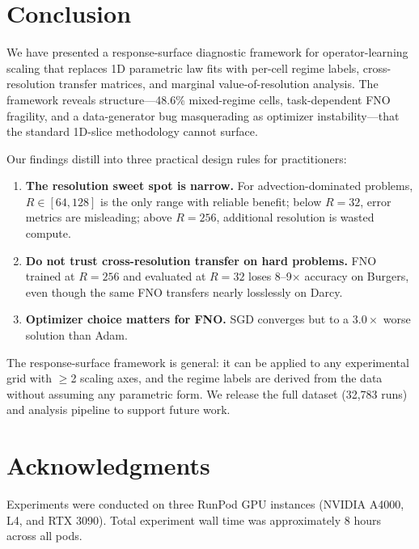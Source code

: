 \documentclass[11pt]{article}
\newcommand{\totalRuns}{32{,}783}
\newcommand{\sgdFnoRatio}{3.0}
\begin{document}
\section{Conclusion}
\label{sec:conclusion}

We have presented a response-surface diagnostic framework for
operator-learning scaling that replaces 1D parametric law fits with
per-cell regime labels, cross-resolution transfer matrices, and
marginal value-of-resolution analysis. The framework reveals
structure---48.6\% mixed-regime cells, task-dependent FNO fragility,
and a data-generator bug masquerading as optimizer instability---that
the standard 1D-slice methodology cannot surface.

Our findings distill into three practical design rules for
practitioners:
\begin{enumerate}
  \item \textbf{The resolution sweet spot is narrow.} For
    advection-dominated problems, $R \in [64, 128]$ is the only
    range with reliable benefit; below $R{=}32$, error metrics are
    misleading; above $R{=}256$, additional resolution is wasted
    compute.
  \item \textbf{Do not trust cross-resolution transfer on hard
    problems.} FNO trained at $R{=}256$ and evaluated at $R{=}32$
    loses 8--9$\times$ accuracy on Burgers, even though the same
    FNO transfers nearly losslessly on Darcy.
  \item \textbf{Optimizer choice matters for FNO.} SGD converges
    but to a $\sgdFnoRatio{\times}$ worse solution than Adam.
\end{enumerate}

The response-surface framework is general: it can be applied to any
experimental grid with $\geq$2 scaling axes, and the regime labels
are derived from the data without assuming any parametric form. We
release the full dataset (\totalRuns{} runs) and analysis pipeline
to support future work.

\section*{Acknowledgments}
Experiments were conducted on three RunPod GPU instances (NVIDIA A4000,
L4, and RTX 3090). Total experiment wall time was approximately 8 hours
across all pods.
\end{document}
